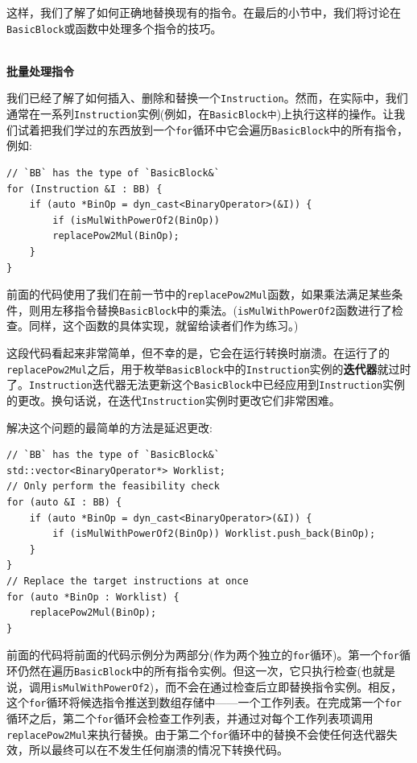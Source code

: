 这样，我们了解了如何正确地替换现有的指令。在最后的小节中，我们将讨论在\texttt{BasicBlock}或函数中处理多个指令的技巧。

\hspace*{\fill} \\ %
\noindent
\textbf{批量处理指令}

我们已经了解了如何插入、删除和替换一个\texttt{Instruction}。然而，在实际中，我们通常在一系列\texttt{Instruction}实例(例如，在\texttt{BasicBlock中})上执行这样的操作。让我们试着把我们学过的东西放到一个\texttt{for}循环中它会遍历\texttt{BasicBlock}中的所有指令，例如:

\begin{lstlisting}[style=styleCXX]
// `BB` has the type of `BasicBlock&`
for (Instruction &I : BB) {
	if (auto *BinOp = dyn_cast<BinaryOperator>(&I)) {
		if (isMulWithPowerOf2(BinOp))
		replacePow2Mul(BinOp);
	}
}
\end{lstlisting}

前面的代码使用了我们在前一节中的\texttt{replacePow2Mul}函数，如果乘法满足某些条件，则用左移指令替换\texttt{BasicBlock}中的乘法。(\texttt{isMulWithPowerOf2}函数进行了检查。同样，这个函数的具体实现，就留给读者们作为练习。)

这段代码看起来非常简单，但不幸的是，它会在运行转换时崩溃。在运行了的\texttt{replacePow2Mul}之后，用于枚举\texttt{BasicBlock}中的\texttt{Instruction}实例的\textbf{迭代器}就过时了。\texttt{Instruction}迭代器无法更新这个\texttt{BasicBlock}中已经应用到\texttt{Instruction}实例的更改。换句话说，在迭代\texttt{Instruction}实例时更改它们非常困难。

解决这个问题的最简单的方法是延迟更改:

\begin{lstlisting}[style=styleCXX]
// `BB` has the type of `BasicBlock&`
std::vector<BinaryOperator*> Worklist;
// Only perform the feasibility check
for (auto &I : BB) {
	if (auto *BinOp = dyn_cast<BinaryOperator>(&I)) {
		if (isMulWithPowerOf2(BinOp)) Worklist.push_back(BinOp);
	}
}
// Replace the target instructions at once
for (auto *BinOp : Worklist) {
	replacePow2Mul(BinOp);
}
\end{lstlisting}

前面的代码将前面的代码示例分为两部分(作为两个独立的\texttt{for}循环)。第一个\texttt{for}循环仍然在遍历\texttt{BasicBlock}中的所有指令实例。但这一次，它只执行检查(也就是说，调用\texttt{isMulWithPowerOf2})，而不会在通过检查后立即替换指令实例。相反，这个\texttt{for}循环将候选指令推送到数组存储中——一个工作列表。在完成第一个\texttt{for}循环之后，第二个\texttt{for}循环会检查工作列表，并通过对每个工作列表项调用\texttt{replacePow2Mul}来执行替换。由于第二个\texttt{for}循环中的替换不会使任何迭代器失效，所以最终可以在不发生任何崩溃的情况下转换代码。

